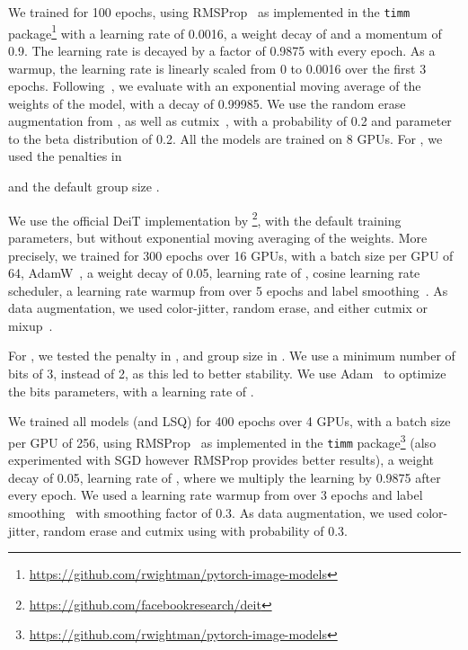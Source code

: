 We trained for 100 epochs, using RMSProp~\cite{tieleman2012lecture} as
implemented in the \texttt{timm} package\footnote{\url{https://github.com/rwightman/pytorch-image-models}}
with a learning rate of 0.0016, a weight decay of  and a momentum of 0.9. The learning rate is decayed
by a factor of 0.9875 with every epoch. As a warmup, the learning rate is linearly scaled from 0 to 0.0016 over the first 3 epochs. Following~\citep{rw2019timm}, we evaluate with an exponential moving average of the weights of the model, with
a decay of 0.99985. We use the random erase augmentation from \citep{rw2019timm}, as well as cutmix~\citep{yun2019cutmix},
with a probability of 0.2 and parameter to the beta distribution of 0.2.
All the models are trained on 8 GPUs. For \diffq, we used the penalties  in 

and the default group size .

We use the official DeiT implementation by \citet{touvron2020training}\footnote{\url{https://github.com/facebookresearch/deit}}, with the default
training parameters, but without exponential moving averaging of the weights. More precisely, we trained for 300 epochs over 16 GPUs, with a batch size per GPU of 64, AdamW~\citep{loshchilov2017decoupled}, a weight decay of 0.05, learning rate of , cosine
learning rate scheduler, a learning rate warmup from  over 5 epochs and label smoothing~\citep{szegedy2016rethinking}. As data augmentation, we used color-jitter, random erase, and either cutmix or mixup~\citep{zhang2017mixup}.

For \diffq, we tested the penalty  in ,
and group size  in . We use a minimum number of bits of 3, instead of 2, as this led to better stability. 
We use Adam~\citep{adam} to optimize the bits parameters, with a learning rate of .

We trained all models (\diffq and LSQ) for 400 epochs over 4 GPUs, with a batch size per GPU of 256, using  RMSProp~\cite{tieleman2012lecture} as implemented in the \texttt{timm} package\footnote{\url{https://github.com/rwightman/pytorch-image-models}} (also experimented with SGD however RMSProp provides better results), a weight decay of 0.05, learning rate of , where we multiply the learning by 0.9875 after every epoch. We used a learning rate warmup from  over 3 epochs and label smoothing~\citep{szegedy2016rethinking} with smoothing factor of 0.3. As data augmentation, we used color-jitter, random erase and cutmix using  with probability of 0.3.


